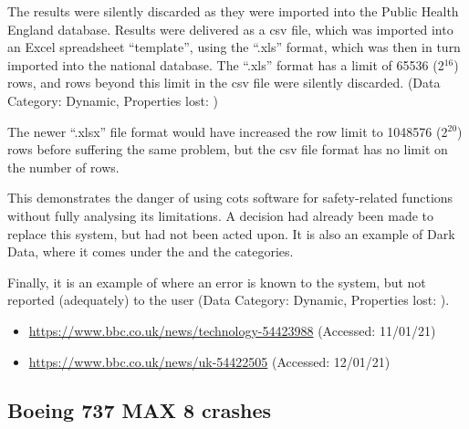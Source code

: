 The results were silently discarded as they were imported into the Public Health England \gls{database}. Results were delivered as a \gls{csv} file, which was imported into an Excel spreadsheet ``template'', using the ``.xls'' format, which was then in turn imported into the national \gls{database}. The ``.xls'' format has a limit of 65536 (2$^{16}$) rows, and rows beyond this limit in the \gls{csv} file were silently discarded. (Data Category: Dynamic, Properties lost: )

The newer ``.xlsx'' file format would have increased the row limit to 1048576 (2$^{20}$) rows before suffering the same problem, but the \gls{csv} file format has no limit on the number of rows.

This demonstrates the danger of using \gls{cots} software for safety-related functions without fully analysing its limitations. A decision had already been made to replace this system, but had not been acted upon. It is also an example of Dark Data, where it comes under the
 and the  categories.

Finally, it is an example of where an error is known to the system, but not reported (adequately) to the user (Data Category: Dynamic, Properties lost: ).

\begin{itemize}
  \item\href{https://www.bbc.co.uk/news/technology-54423988}{https://www.bbc.co.uk/news/technology-54423988} (Accessed: 11/01/21)
  \item\href{https://www.bbc.co.uk/news/uk-54422505}{https://www.bbc.co.uk/news/uk-54422505} (Accessed: 12/01/21)
\end{itemize}


\subsection{Boeing 737 MAX 8 crashes} \label{bkm:incacc:737max8}

